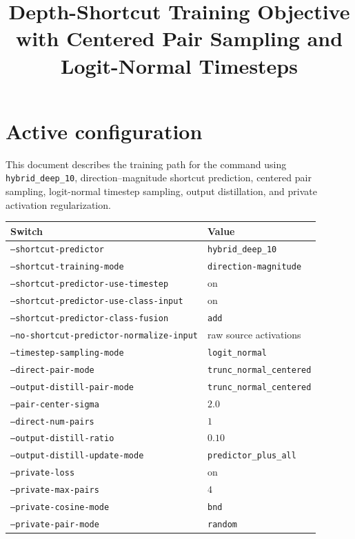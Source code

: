 \documentclass[11pt]{article}
\title{Depth-Shortcut Training Objective with Centered Pair Sampling and Logit-Normal Timesteps}
\author{}
\date{}
\begin{document}
\maketitle

\section{Active configuration}

This document describes the training path for the command using
\texttt{hybrid\_deep\_10}, direction--magnitude shortcut prediction,
centered pair sampling, logit-normal timestep sampling, output distillation,
and private activation regularization.

\begin{center}
\begin{tabular}{ll}
\toprule
Switch & Value \\
\midrule
\texttt{--shortcut-predictor} & \texttt{hybrid\_deep\_10} \\
\texttt{--shortcut-training-mode} & \texttt{direction-magnitude} \\
\texttt{--shortcut-predictor-use-timestep} & on \\
\texttt{--shortcut-predictor-use-class-input} & on \\
\texttt{--shortcut-predictor-class-fusion} & \texttt{add} \\
\texttt{--no-shortcut-predictor-normalize-input} & raw source activations \\
\texttt{--timestep-sampling-mode} & \texttt{logit\_normal} \\
\texttt{--direct-pair-mode} & \texttt{trunc\_normal\_centered} \\
\texttt{--output-distill-pair-mode} & \texttt{trunc\_normal\_centered} \\
\texttt{--pair-center-sigma} & $2.0$ \\
\texttt{--direct-num-pairs} & $1$ \\
\texttt{--output-distill-ratio} & $0.10$ \\
\texttt{--output-distill-update-mode} & \texttt{predictor\_plus\_all} \\
\texttt{--private-loss} & on \\
\texttt{--private-max-pairs} & $4$ \\
\texttt{--private-cosine-mode} & \texttt{bnd} \\
\texttt{--private-pair-mode} & \texttt{random} \\
\bottomrule
\end{tabular}
\end{center}
\end{document}

